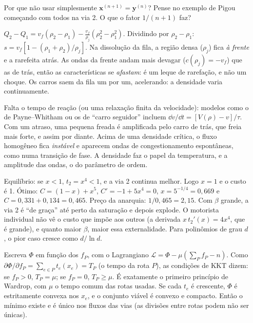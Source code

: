 \documentclass[11pt]{article}
\begin{document}
 Por que não usar simplesmente $\bm x^{(n+1)} = \bm y^{(n)}$? Pense no exemplo de Pigou começando com todos na via 2. O que o fator $1/(n+1)$ faz?

\solucoes

$Q_2-Q_1 = v_f(\rho_2-\rho_1)-\frac{v_f}{\rho_j}(\rho_2^2-\rho_1^2)$. Dividindo por $\rho_2-\rho_1$: $s = v_f[1-(\rho_1+\rho_2)/\rho_j]$. Na dissolução da fila, a região densa ($\rho_j$) fica \emph{à frente} e a rarefeita atrás. As ondas da frente andam mais devagar ($c(\rho_j) = -v_f$) que as de trás, então as características se \emph{afastam}: é um leque de rarefação, e não um choque. Os carros saem da fila um por um, acelerando: a densidade varia continuamente.

Falta o tempo de reação (ou uma relaxação finita da velocidade): modelos como o de Payne--Whitham ou os de ``carro seguidor'' incluem $\dd v/\dd t = [V(\rho)-v]/\tau$. Com um atraso, uma pequena freada é amplificada pelo carro de trás, que freia mais forte, e assim por diante. Acima de uma densidade crítica, o fluxo homogêneo fica \emph{instável} e aparecem ondas de congestionamento espontâneas, como numa transição de fase. A densidade faz o papel da temperatura, e a amplitude das ondas, o do parâmetro de ordem.

Equilíbrio: se $x<1$, $t_2 = x^4<1$, e a via 2 continua melhor. Logo $x=1$ e o custo é 1. Ótimo: $C = (1-x)+x^5$, $C' = -1+5x^4 = 0$, $x = 5^{-1/4} = 0{,}669$ e $C = 0{,}331+0{,}134 = 0{,}465$. Preço da anarquia: $1/0{,}465 = 2{,}15$. Com $\beta$ grande, a via 2 é ``de graça'' até perto da saturação e depois explode. O motorista individual não vê o custo que impõe aos outros (a derivada $x\,t_2'(x) = 4x^4$, que é grande), e quanto maior $\beta$, maior essa externalidade. Para polinômios de grau $d$, o pior caso cresce como $d/\ln d$.

Escreva $\Phi$ em função dos $f_P$, com o Lagrangiano $\mathcal L = \Phi-\mu(\sum_Pf_P-n)$. Como $\partial\Phi/\partial f_P = \sum_{e\in P}t_e(x_e) = T_P$ (o tempo da rota $P$), as condições de KKT dizem: se $f_P>0$, $T_P = \mu$; se $f_P = 0$, $T_P\ge\mu$. É exatamente o primeiro princípio de Wardrop, com $\mu$ o tempo comum das rotas usadas. Se cada $t_e$ é crescente, $\Phi$ é estritamente convexa nos $x_e$, e o conjunto viável é convexo e compacto. Então o mínimo existe e é único nos fluxos das vias (as divisões entre rotas podem não ser únicas).
\end{document}

